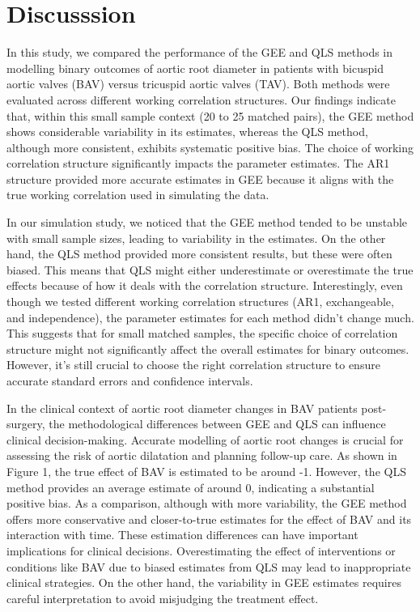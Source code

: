 \documentclass[
]{aft}
\begin{document}
\section{Discusssion}\label{discusssion}

In this study, we compared the performance of the GEE and QLS methods in
modelling binary outcomes of aortic root diameter in patients with
bicuspid aortic valves (BAV) versus tricuspid aortic valves (TAV). Both
methods were evaluated across different working correlation structures.
Our findings indicate that, within this small sample context (20 to 25
matched pairs), the GEE method shows considerable variability in its
estimates, whereas the QLS method, although more consistent, exhibits
systematic positive bias. The choice of working correlation structure
significantly impacts the parameter estimates. The AR1 structure
provided more accurate estimates in GEE because it aligns with the true
working correlation used in simulating the data.

In our simulation study, we noticed that the GEE method tended to be
unstable with small sample sizes, leading to variability in the
estimates. On the other hand, the QLS method provided more consistent
results, but these were often biased. This means that QLS might either
underestimate or overestimate the true effects because of how it deals
with the correlation structure. Interestingly, even though we tested
different working correlation structures (AR1, exchangeable, and
independence), the parameter estimates for each method didn't change
much. This suggests that for small matched samples, the specific choice
of correlation structure might not significantly affect the overall
estimates for binary outcomes. However, it's still crucial to choose the
right correlation structure to ensure accurate standard errors and
confidence intervals.

In the clinical context of aortic root diameter changes in BAV patients
post-surgery, the methodological differences between GEE and QLS can
influence clinical decision-making. Accurate modelling of aortic root
changes is crucial for assessing the risk of aortic dilatation and
planning follow-up care. As shown in Figure 1, the true effect of BAV is
estimated to be around -1. However, the QLS method provides an average
estimate of around 0, indicating a substantial positive bias. As a
comparison, although with more variability, the GEE method offers more
conservative and closer-to-true estimates for the effect of BAV and its
interaction with time. These estimation differences can have important
implications for clinical decisions. Overestimating the effect of
interventions or conditions like BAV due to biased estimates from QLS
may lead to inappropriate clinical strategies. On the other hand, the
variability in GEE estimates requires careful interpretation to avoid
misjudging the treatment effect.
\end{document}
